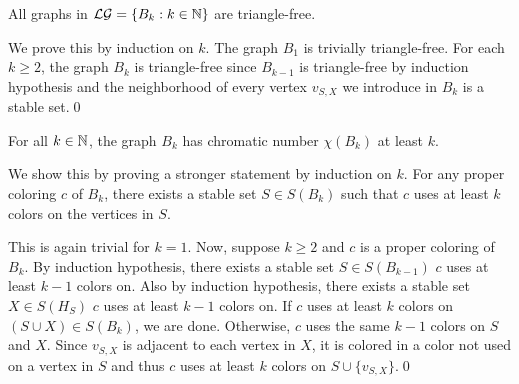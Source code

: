 \begin{thm}
All graphs in $\mathcal{LG}=\lbrace B_k :k\in\mathbb{N}\rbrace$ are triangle-free.
\end{thm}

\begin{prf}
We prove this by induction on $k$. The graph $B_1$ is trivially triangle-free. For each $k\geq 2$, the graph $B_k$ is triangle-free since $B_{k-1}$ is triangle-free by induction hypothesis and the neighborhood of every vertex $v_{S,X}$ we introduce in $B_k$ is a stable set.\qed
\end{prf}

\begin{thm}\label{t2ls}
For all $k\in\mathbb{N}$, the graph $B_k$ has chromatic number $\chi (B_k)$ at least $k$.
\end{thm}

\begin{prf}
We show this by proving a stronger statement by induction on $k$. For any proper coloring $c$ of $B_k$, there exists a stable set $S\in S(B_k)$ such that $c$ uses at least $k$ colors on the vertices in $S$.

This is again trivial for $k=1$. Now, suppose $k\geq 2$ and $c$ is a proper coloring of $B_k$. By induction hypothesis, there exists a stable set $S\in S(B_{k-1})$ $c$ uses at least $k-1$ colors on. Also by induction hypothesis, there exists a stable set $X\in S(H_S)$ $c$ uses at least $k-1$ colors on. If $c$ uses at least $k$ colors on $(S\cup X)\in S(B_k)$, we are done. Otherwise, $c$ uses the same $k-1$ colors on $S$ and $X$. Since $v_{S,X}$ is adjacent to each vertex in $X$, it is colored in a color not used on a vertex in $S$ and thus $c$ uses at least $k$ colors on $S\cup\lbrace v_{S,X}\rbrace$.\qed 
\end{prf}

